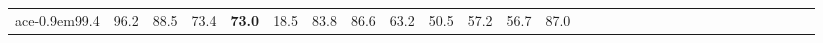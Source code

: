 \begin{table*}[]
\begin{tabular}{cc|cccccccccccccccccccccccccccc}
ace{-0.9em}99.4\hspace{-0.4em} & \hspace{-0.9em}96.2\hspace{-0.4em} & \hspace{-0.9em}88.5\hspace{-0.4em} & \hspace{-0.9em}73.4\hspace{-0.4em} & \hspace{-0.9em}\textbf{73.0}\hspace{-0.4em} & \hspace{-0.9em}18.5\hspace{-0.4em} & \hspace{-0.9em}83.8\hspace{-0.4em} & \hspace{-0.9em}86.6\hspace{-0.4em} & \hspace{-0.9em}63.2\hspace{-0.4em} & \hspace{-0.9em}50.5\hspace{-0.4em} & \hspace{-0.9em}57.2\hspace{-0.4em} & \hspace{-0.9em}56.7\hspace{-0.4em} & \hspace{-0.9em}87.0\hspace{-0.4em} 
        \\

\end{tabular}
\end{table*}
